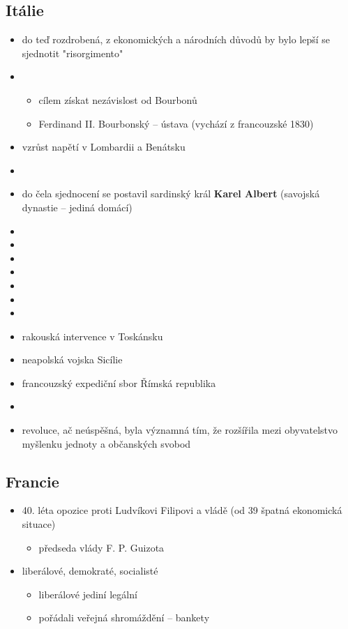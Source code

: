 \subsection{Itálie}
\begin{itemize}
\item do teď rozdrobená, z ekonomických a národních důvodů by bylo lepší se sjednotit \ra "risorgimento"
\item {}
	\begin{itemize}
	\item cílem získat nezávislost od Bourbonů
	\item Ferdinand II. Bourbonský -- ústava (vychází z francouzské 1830)
	\end{itemize}
\item[\ra] vzrůst napětí v Lombardii a Benátsku
\item {}
\item do čela sjednocení se postavil sardinský král \textbf{Karel Albert} (savojská dynastie -- jediná domácí)
\item {}
\item {}
\item {}
\item 
\item 
\item 
\item
\item rakouská intervence v Toskánsku
\item neapolská vojska \ra Sicílie
\item francouzský expediční sbor \ra Římská republika
\item {}
\item revoluce, ač neúspěšná, byla významná tím, že rozšířila mezi obyvatelstvo myšlenku jednoty a občanských svobod
\end{itemize}


\subsection{Francie}
\begin{itemize}
\item 40. léta opozice proti Ludvíkovi Filipovi a vládě (od 39 špatná ekonomická situace)
	\begin{itemize}
	\item předseda vlády F. P. Guizota
	\end{itemize}
\item liberálové, demokraté, socialisté
	\begin{itemize}
	\item liberálové jediní legální
	\item pořádali veřejná shromáždění -- bankety
	\end{itemize}
\end{itemize}

